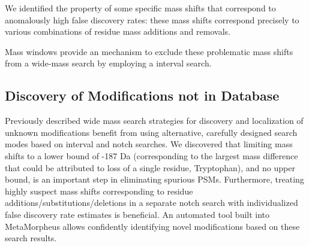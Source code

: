 \documentclass[journal=jprobs,manuscript=article]{achemso}
\begin{document}
We identified the property of some specific mass shifts that correspond to anomalously high false discovery rates: these mass shifts correspond precisely to various combinations of residue mass additions and removals.

Mass windows provide an mechanism to exclude these problematic mass shifts from a wide-mass search by employing a interval search.

\subsection{Discovery of Modifications not in Database}

Previously described wide mass search strategies for discovery and localization of unknown modifications benefit from using alternative, carefully designed search modes based on interval and notch searches.
We discovered that limiting mass shifts to a lower bound of -187 Da (corresponding to the largest mass difference that could be attributed to loss of a single residue, Tryptophan), and no upper bound, is an important step in eliminating spurious PSMs.
Furthermore, treating highly suspect mass shifts corresponding to residue additions/substitutions/deletions in a separate notch search with individualized false discovery rate estimates is beneficial.
An automated tool built into MetaMorpheus allows confidently identifying novel modifications based on these search results.
\end{document}
